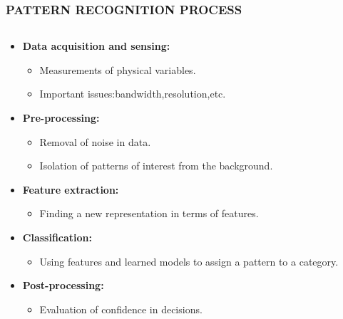 \documentclass{beamer}
\begin{document}
\begin{frame}

\frametitle{PATTERN RECOGNITION PROCESS}

\begin{columns}
\begin{column}{.85\textwidth}
\begin{itemize}

\item {\textbf{Data acquisition and sensing:}} \pause
\begin{itemize}
\item Measurements of physical variables.\\ \pause
\item Important issues:bandwidth,resolution,etc. \pause
\end{itemize}
\end{itemize}
\begin{itemize}
\item {\textbf{Pre-processing:}} \pause
\begin{itemize}
\item Removal of noise in data.\\ \pause
\item Isolation of patterns of interest from the background. \pause
\end{itemize}
\end{itemize}
\begin{itemize}
\item {\textbf{Feature extraction:}} \pause
\begin{itemize}
\item Finding a new representation in terms of features. \pause
\end{itemize}
\end{itemize}
\begin{itemize}
\item {\textbf{Classification:}} \pause
\begin{itemize}
\item Using features and learned models to assign a pattern to a category. \pause
\end{itemize}
\end{itemize}
\begin{itemize}
\item {\textbf{Post-processing:}} \pause
\begin{itemize}
\item Evaluation of confidence in decisions. \pause
\end{itemize}
\end{itemize}
\end{column}
\begin{column}{.5\textwidth}


\end{column}
\end{columns}
\end{frame}
\end{document}
